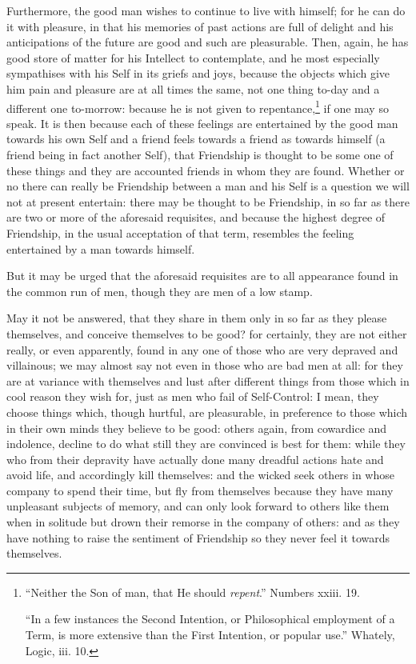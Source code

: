 Furthermore, the good man wishes to continue to live with himself; for he can
do it with pleasure, in that his memories of past actions are full of delight
and his anticipations of the future are good and such are pleasurable. Then,
again, he has good store of matter for his Intellect to contemplate, and he
most especially sympathises with his Self in its griefs and joys, because the
objects which give him pain and pleasure are at all times the same, not one
thing to-day and a different one to-morrow: because he is not given to
repentance,\footnote{“Neither the Son of man, that He should \emph{repent}.” Numbers
xxiii. 19.

“In a few instances the Second Intention, or Philosophical employment
of a Term, is more extensive than the First Intention, or popular use.”
Whately, Logic, iii. 10.}
if one may so speak. It is then because each of these feelings are entertained
by the good man towards his own Self and a friend feels towards a friend as
towards himself (a friend being in fact another Self), that Friendship is
thought to be some one of these things and they are accounted friends in whom
they are found. Whether or no there can really be Friendship between a man and
his Self is a question we will not at present entertain: there may be thought
to be Friendship, in so far as there are two or more of the aforesaid
requisites, and because the highest degree of Friendship, in the usual
acceptation of that term, resembles the feeling entertained by a man towards
himself.

But it may be urged that the aforesaid requisites are to all appearance found
in the common run of men, though they are men of a low stamp.

May it not be answered, that they share in them only in so far as they please
themselves, and conceive themselves to be good? for certainly, they are not
either really, or even apparently, found in any one of those who are very
depraved and villainous; we may almost say not even in those who are bad men at
all: for they are at variance with themselves and lust after different things
from those which in cool reason they wish for, just as men who fail of
Self-Control: I mean, they choose things which, though hurtful, are
pleasurable, in preference to those which in their own minds they believe to be
good: others again, from cowardice and indolence, decline to do what still they
are convinced is best for them: while they who from their depravity have
actually done many dreadful actions hate and avoid life, and accordingly kill
themselves: and the wicked seek others in whose company to spend their time,
but fly from themselves because they have many unpleasant subjects of memory,
and can only look forward to others like them when in solitude but drown their
remorse in the company of others: and as they have nothing to raise the
sentiment of Friendship so they never feel it towards themselves.

